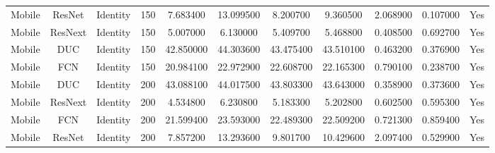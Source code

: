 \begin{tabular}{|c||c||c||c||c||c||c||c||c||c||c|}
Mobile & ResNet & Identity & 150 & 7.683400 & 13.099500 & 8.200700 & 9.360500 & 2.068900 & 0.107000 & Yes \\
Mobile & ResNext & Identity & 150 & 5.007000 & 6.130000 & 5.409700 & 5.468800 & 0.408500 & 0.692700 & Yes \\
Mobile & DUC & Identity & 150 & 42.850000 & 44.303600 & 43.475400 & 43.510100 & 0.463200 & 0.376900 & Yes \\
Mobile & FCN & Identity & 150 & 20.984100 & 22.972900 & 22.608700 & 22.165300 & 0.790100 & 0.238700 & Yes \\
Mobile & DUC & Identity & 200 & 43.088100 & 44.017500 & 43.803300 & 43.643000 & 0.358900 & 0.373600 & Yes \\
Mobile & ResNext & Identity & 200 & 4.534800 & 6.230800 & 5.183300 & 5.202800 & 0.602500 & 0.595300 & Yes \\
Mobile & FCN & Identity & 200 & 21.599400 & 23.593000 & 22.489300 & 22.509200 & 0.721300 & 0.859400 & Yes \\
Mobile & ResNet & Identity & 200 & 7.857200 & 13.293600 & 9.801700 & 10.429600 & 2.097400 & 0.529900 & Yes \\
\bottomrule
\end{tabular}
